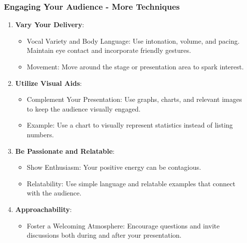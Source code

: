 \documentclass[aspectratio=169]{beamer}
\begin{document}
\begin{frame}[fragile]
  \frametitle{Engaging Your Audience - More Techniques}
  \begin{enumerate}
    \item \textbf{Vary Your Delivery}:
    \begin{itemize}
      \item Vocal Variety and Body Language: Use intonation, volume, and pacing. Maintain eye contact and incorporate friendly gestures.
      \item Movement: Move around the stage or presentation area to spark interest.
    \end{itemize}

    \item \textbf{Utilize Visual Aids}:
    \begin{itemize}
      \item Complement Your Presentation: Use graphs, charts, and relevant images to keep the audience visually engaged.
      \item Example: Use a chart to visually represent statistics instead of listing numbers.
    \end{itemize}

    \item \textbf{Be Passionate and Relatable}:
    \begin{itemize}
      \item Show Enthusiasm: Your positive energy can be contagious.
      \item Relatability: Use simple language and relatable examples that connect with the audience.
    \end{itemize}

    \item \textbf{Approachability}:
    \begin{itemize}
      \item Foster a Welcoming Atmosphere: Encourage questions and invite discussions both during and after your presentation.
    \end{itemize}
  \end{enumerate}
\end{frame}
\end{document}
